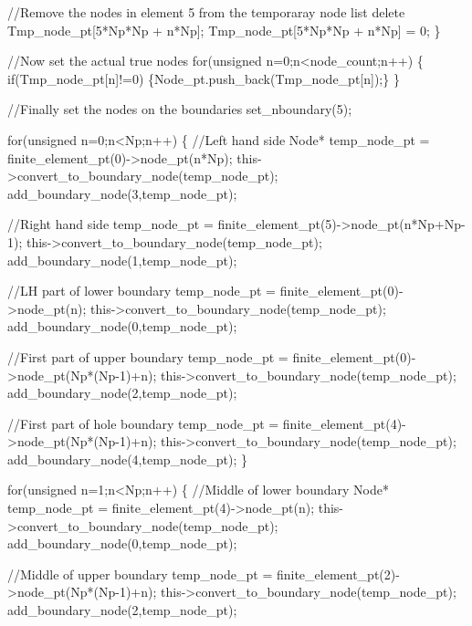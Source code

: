 \begin{DoxyCodeInclude}
     \textcolor{comment}{//Remove the nodes in element 5 from the temporaray node list}
     \textcolor{keyword}{delete} Tmp\_node\_pt[5*Np*Np + n*Np];
     Tmp\_node\_pt[5*Np*Np + n*Np] = 0;
    \}

   \textcolor{comment}{//Now set the actual true nodes}
   \textcolor{keywordflow}{for}(\textcolor{keywordtype}{unsigned} n=0;n<node\_count;n++)
    \{
     \textcolor{keywordflow}{if}(Tmp\_node\_pt[n]!=0) \{Node\_pt.push\_back(Tmp\_node\_pt[n]);\}
    \}

 

   \textcolor{comment}{//Finally set the nodes on the boundaries}
   set\_nboundary(5);
   
   \textcolor{keywordflow}{for}(\textcolor{keywordtype}{unsigned} n=0;n<Np;n++)
    \{
     \textcolor{comment}{//Left hand side}
     Node* temp\_node\_pt = finite\_element\_pt(0)->node\_pt(n*Np);
     this->convert\_to\_boundary\_node(temp\_node\_pt);
     add\_boundary\_node(3,temp\_node\_pt);
     

     \textcolor{comment}{//Right hand side}
     temp\_node\_pt = finite\_element\_pt(5)->node\_pt(n*Np+Np-1);
     this->convert\_to\_boundary\_node(temp\_node\_pt);
     add\_boundary\_node(1,temp\_node\_pt);
     
     \textcolor{comment}{//LH part of lower boundary}
     temp\_node\_pt = finite\_element\_pt(0)->node\_pt(n);
     this->convert\_to\_boundary\_node(temp\_node\_pt);
     add\_boundary\_node(0,temp\_node\_pt);

     \textcolor{comment}{//First part of upper boundary}
     temp\_node\_pt = finite\_element\_pt(0)->node\_pt(Np*(Np-1)+n);
     this->convert\_to\_boundary\_node(temp\_node\_pt);
     add\_boundary\_node(2,temp\_node\_pt);
     
     \textcolor{comment}{//First part of hole boundary}
     temp\_node\_pt = finite\_element\_pt(4)->node\_pt(Np*(Np-1)+n);
     this->convert\_to\_boundary\_node(temp\_node\_pt);
     add\_boundary\_node(4,temp\_node\_pt);
    \}

   \textcolor{keywordflow}{for}(\textcolor{keywordtype}{unsigned} n=1;n<Np;n++)
    \{
     \textcolor{comment}{//Middle of lower boundary}
     Node* temp\_node\_pt = finite\_element\_pt(4)->node\_pt(n);
     this->convert\_to\_boundary\_node(temp\_node\_pt);
     add\_boundary\_node(0,temp\_node\_pt);
     
     \textcolor{comment}{//Middle of upper boundary                                }
     temp\_node\_pt = finite\_element\_pt(2)->node\_pt(Np*(Np-1)+n);
     this->convert\_to\_boundary\_node(temp\_node\_pt);
     add\_boundary\_node(2,temp\_node\_pt);


\end{DoxyCodeInclude}
